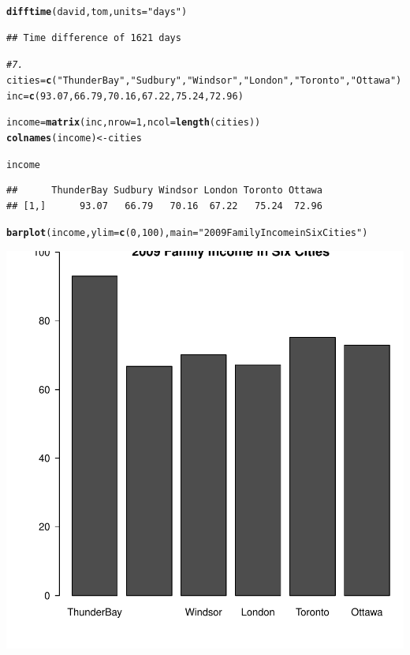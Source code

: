 \documentclass{article}\usepackage[]{graphicx}\usepackage[]{xcolor}
\makeatletter
\newcommand{\hlnum}[1]{\textcolor[rgb]{0.686,0.059,0.569}{#1}}%
\newcommand{\hlstr}[1]{\textcolor[rgb]{0.192,0.494,0.8}{#1}}%
\newcommand{\hlcom}[1]{\textcolor[rgb]{0.678,0.584,0.686}{\textit{#1}}}%
\newcommand{\hlstd}[1]{\textcolor[rgb]{0.345,0.345,0.345}{#1}}%
\newcommand{\hlkwb}[1]{\textcolor[rgb]{0.69,0.353,0.396}{#1}}%
\newcommand{\hlkwc}[1]{\textcolor[rgb]{0.333,0.667,0.333}{#1}}%
\newcommand{\hlkwd}[1]{\textcolor[rgb]{0.737,0.353,0.396}{\textbf{#1}}}%
\newenvironment{kframe}{%
 \def\at@end@of@kframe{}%
 \ifinner\ifhmode%
  \def\at@end@of@kframe{\end{minipage}}%
  \begin{minipage}{\columnwidth}%
 \fi\fi%
 \def\FrameCommand##1{\hskip\@totalleftmargin \hskip-\fboxsep
 \colorbox{shadecolor}{##1}\hskip-\fboxsep
     \hskip-\linewidth \hskip-\@totalleftmargin \hskip\columnwidth}%
 \MakeFramed {\advance\hsize-\width
   \@totalleftmargin\z@ \linewidth\hsize
   \@setminipage}}%
 {\par\unskip\endMakeFramed%
 \at@end@of@kframe}
\newenvironment{knitrout}{}{} %
\makeatother
\begin{document}
\begin{knitrout}
\begin{kframe}
\begin{alltt}
\hlkwd{difftime}\hlstd{(david, tom,} \hlkwc{units} \hlstd{=} \hlstr{"days"}\hlstd{)}
\end{alltt}
\begin{verbatim}
## Time difference of 1621 days
\end{verbatim}
\begin{alltt}
\hlcom{# 7.}
\hlstd{cities} \hlkwb{=} \hlkwd{c}\hlstd{(}\hlstr{"ThunderBay"}\hlstd{,} \hlstr{"Sudbury"}\hlstd{,} \hlstr{"Windsor"}\hlstd{,} \hlstr{"London"}\hlstd{,} \hlstr{"Toronto"}\hlstd{,} \hlstr{"Ottawa"}\hlstd{)}
\hlstd{inc} \hlkwb{=} \hlkwd{c}\hlstd{(}\hlnum{93.07}\hlstd{,} \hlnum{66.79}\hlstd{,} \hlnum{70.16}\hlstd{,} \hlnum{67.22}\hlstd{,} \hlnum{75.24}\hlstd{,} \hlnum{72.96}\hlstd{)}

\hlstd{income} \hlkwb{=} \hlkwd{matrix}\hlstd{(inc,} \hlkwc{nrow} \hlstd{=} \hlnum{1}\hlstd{,} \hlkwc{ncol} \hlstd{=} \hlkwd{length}\hlstd{(cities))}
\hlkwd{colnames}\hlstd{(income)} \hlkwb{<-} \hlstd{cities}

\hlstd{income}
\end{alltt}
\begin{verbatim}
##      ThunderBay Sudbury Windsor London Toronto Ottawa
## [1,]      93.07   66.79   70.16  67.22   75.24  72.96
\end{verbatim}
\begin{alltt}
\hlkwd{barplot}\hlstd{(income,} \hlkwc{ylim} \hlstd{=} \hlkwd{c}\hlstd{(}\hlnum{0}\hlstd{,}\hlnum{100}\hlstd{),} \hlkwc{main} \hlstd{=} \hlstr{"2009 Family Income in Six Cities"}\hlstd{)}
\end{alltt}
\end{kframe}

{\centering \includegraphics[width=.6\linewidth]{figure/Meng51940633A3-Rnwauto-report-1} 

}



\end{knitrout}
\end{document}
